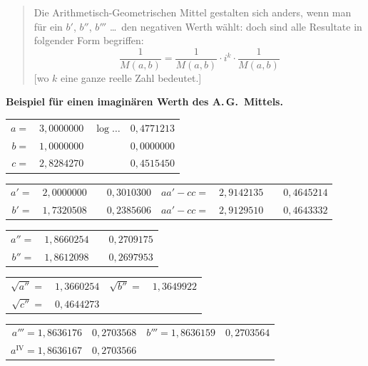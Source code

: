 \documentclass[12pt,a4paper]{article}
\begin{document}
\begin{quote}
Die Arithmetisch-Geometrischen Mittel gestalten sich anders, wenn man f\"ur ein $b'$, $b''$, $b'''$ \dots\ den negativen Werth w\"ahlt: doch sind alle Resultate in folgender Form begriffen:
\[
\frac{1}{M(a,b)} = \frac{1}{M(a,b)} \cdot i^k \cdot \frac{1}{M(a,b)}
\]
[wo $k$ eine ganze reelle Zahl bedeutet.]
\end{quote}

\textbf{Beispiel f\"ur einen imagin\"aren Werth des A.\,G.\ Mittels.}

\begin{center}
\begin{tabular}{r@{\ }l r@{\ }l}
$a =$ & $3{,}0000000$ & $\log \dots$ & $0{,}4771213$ \\
$b =$ & $1{,}0000000$ & & $0{,}0000000$ \\
$c =$ & $2{,}8284270$ & & $0{,}4515450$
\end{tabular}
\end{center}

\begin{center}
\begin{tabular}{r@{\ }l r@{\ }l r@{\ }l r@{\ }l}
$a'=$ & $2{,}0000000$ & & $0{,}3010300$ & $aa'-cc=$ & $2{,}9142135$ & & $0{,}4645214$ \\
$b'=$ & $1{,}7320508$ & & $0{,}2385606$ & $aa'-cc=$ & $2{,}9129510$ & & $0{,}4643332$
\end{tabular}
\end{center}

\begin{center}
\begin{tabular}{r@{\ }l r@{\ }l}
$a'' =$ & $1{,}8660254$ & & $0{,}2709175$ \\
$b'' =$ & $1{,}8612098$ & & $0{,}2697953$
\end{tabular}
\end{center}

\begin{center}
\begin{tabular}{r@{\ }l r@{\ }l}
$\sqrt{a''} =$ & $1{,}3660254$ & $\sqrt{b''} =$ & $1{,}3649922$ \\
$\sqrt{c''} =$ & $0{,}4644273$
\end{tabular}
\end{center}

\begin{center}
\begin{tabular}{r@{\ }l r@{\ }l}
$a''' = 1{,}8636176$ & $0{,}2703568$ & $b''' = 1{,}8636159$ & $0{,}2703564$ \\
$a^{\mathrm{IV}} = 1{,}8636167$ & $0{,}2703566$ & &
\end{tabular}
\end{center}
\end{document}
